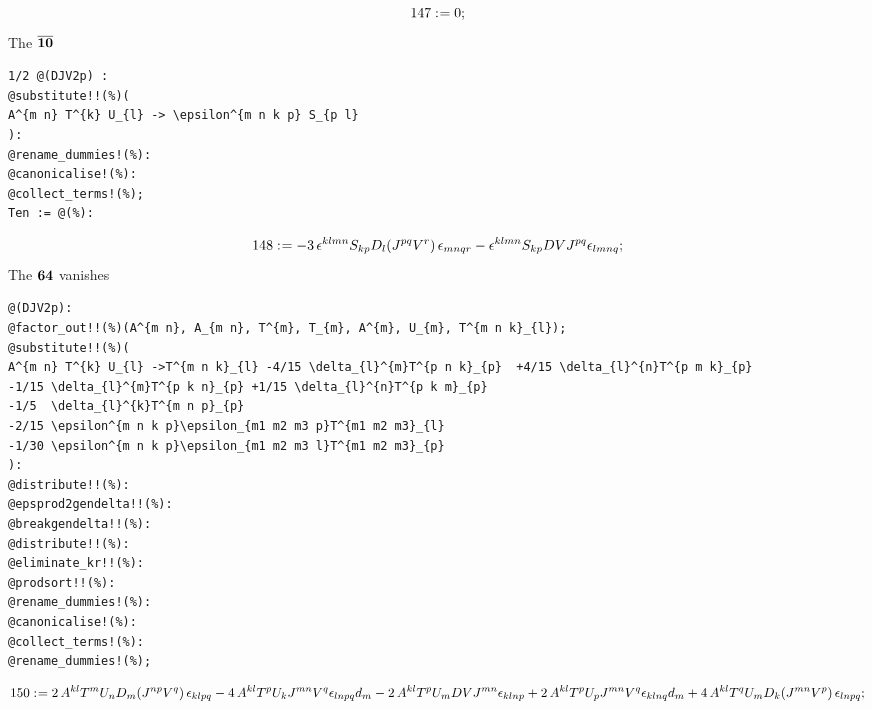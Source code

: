 \documentclass[11pt]{article}
\def\specialcolon{\mathrel{\mathop{:}}\hspace{-.5em}}
\renewcommand{\bar}[1]{\overline{#1}}
\begin{document}
\begin{dmath*}[compact, spread=2pt]
147\specialcolon{}= 0;
\end{dmath*}
The $\bf \bar{10}$
{\color[named]{Blue}\begin{verbatim}
1/2 @(DJV2p) :
@substitute!!(%)(
A^{m n} T^{k} U_{l} -> \epsilon^{m n k p} S_{p l}
):
@rename_dummies!(%):
@canonicalise!(%):
@collect_terms!(%);
Ten := @(%):
\end{verbatim}}


\begin{dmath*}[compact, spread=2pt]
148\specialcolon{}=  - 3\, {\epsilon}^{k l m n} {S}_{k p} {D}_{l}{({J}^{p q} {V}^{r})}\,  {\epsilon}_{m n q r} - {\epsilon}^{k l m n} {S}_{k p} DV {J}^{p q} {\epsilon}_{l m n q};
\end{dmath*}
The $\bf 64$ vanishes
{\color[named]{Blue}\begin{verbatim}
@(DJV2p):
@factor_out!!(%)(A^{m n}, A_{m n}, T^{m}, T_{m}, A^{m}, U_{m}, T^{m n k}_{l});
@substitute!!(%)(
A^{m n} T^{k} U_{l} ->T^{m n k}_{l} -4/15 \delta_{l}^{m}T^{p n k}_{p}  +4/15 \delta_{l}^{n}T^{p m k}_{p} 
-1/15 \delta_{l}^{m}T^{p k n}_{p} +1/15 \delta_{l}^{n}T^{p k m}_{p} 
-1/5  \delta_{l}^{k}T^{m n p}_{p} 
-2/15 \epsilon^{m n k p}\epsilon_{m1 m2 m3 p}T^{m1 m2 m3}_{l}
-1/30 \epsilon^{m n k p}\epsilon_{m1 m2 m3 l}T^{m1 m2 m3}_{p}
):
@distribute!!(%):
@epsprod2gendelta!!(%):
@breakgendelta!!(%):
@distribute!!(%):
@eliminate_kr!!(%):
@prodsort!!(%):
@rename_dummies!(%):
@canonicalise!(%):
@collect_terms!(%):
@rename_dummies!(%);
\end{verbatim}}


\begin{dmath*}[compact, spread=2pt]
150\specialcolon{}= 2\, {A}^{k l} {T}^{m} {U}_{n} {D}_{m}{({J}^{n p} {V}^{q})}\,  {\epsilon}_{k l p q} - 4\, {A}^{k l} {T}^{p} {U}_{k} {J}^{m n} {V}^{q} {\epsilon}_{l n p q} {d}_{m} - 2\, {A}^{k l} {T}^{p} {U}_{m} DV {J}^{m n} {\epsilon}_{k l n p} + 2\, {A}^{k l} {T}^{p} {U}_{p} {J}^{m n} {V}^{q} {\epsilon}_{k l n q} {d}_{m} + 4\, {A}^{k l} {T}^{q} {U}_{m} {D}_{k}{({J}^{m n} {V}^{p})}\,  {\epsilon}_{l n p q};
\end{dmath*}
\end{document}
